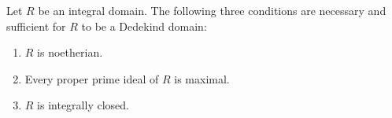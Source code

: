 Let $R$ be an integral domain. The following three conditions are necessary and sufficient for $R$ to be a Dedekind domain:
\begin{enumerate}
  \item $R$ is noetherian.
  \item Every proper prime ideal of $R$ is maximal.
  \item $R$ is integrally closed.
\end{enumerate}
